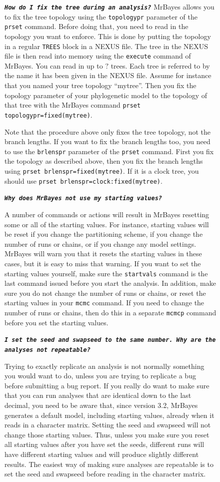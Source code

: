 \documentclass[12pt]{book}
\newcommand{\ttt}[1]{\texttt{#1}}
\newcommand{\tb}[1]{\ttt{\textbf{#1}}}
\begin{document}
\begin{figure}[h]
\tb{\it{How do I fix the tree during an analysis?}}
MrBayes allows you to fix the tree topology using the \ttt{topologypr} parameter of the \ttt{prset}
command. Before doing that, you need to read in the topology you want to enforce. This is done by
putting the topology in a regular \ttt{TREES} block in a NEXUS file. The tree in the NEXUS file is
then read into memory using the \ttt{execute} command of MrBayes. You can read in up to $?$ trees.
Each tree is referred to by the name it has been given in the NEXUS file. Assume for instance that
you named your tree topology ``mytree''. Then you fix the topology parameter of your phylogenetic
model to the topology of that tree with the MrBayes command \ttt{prset topologypr=fixed(mytree)}.

Note that the procedure above only fixes the tree topology, not the branch lengths. If you want to
fix the branch lengths too, you need to use the \ttt{brlenspr} parameter of the \ttt{prset}
command. First you fix the topology as described above, then you fix the branch lengths using
\ttt{prset brlenspr=fixed(mytree)}. If it is a clock tree, you should use \ttt{prset
brlenspr=clock:fixed(mytree)}.

\tb{\it{Why does MrBayes not use my starting values?}}

A number of commands or actions will result in MrBayes resetting some or all of the starting
values. For instance, starting values will be reset if you change the partitioning scheme, if you
change the number of runs or chains, or if you change any model settings. MrBayes will warn you
that it resets the starting values in these cases, but it is easy to miss that warning. If you want
to set the starting values yourself, make sure the \ttt{startvals} command is the last command
issued before you start the analysis. In addition, make sure you do not change the number of runs
or chains, or reset the starting values in your \ttt{mcmc} command. If you need to change the
number of runs or chains, then do this in a separate \ttt{mcmcp} command before you set the
starting values.

\tb{\it{I set the seed and swapseed to the same number. Why are the analyses not repeatable?}}

Trying to exactly replicate an analysis is not normally something you would want to do, unless you
are trying to replicate a bug before submitting a bug report. If you really do want to make sure
that you can run analyses that are identical down to the last decimal, you need to be aware that,
since version 3.2, MrBayes generates a default model, including starting values, already when it
reads in a character matrix. Setting the seed and swapseed will not change those starting values.
Thus, unless you make sure you reset all starting values after you have set the seeds, different
runs will have different starting values and will produce slightly different results. The easiest
way of making sure analyses are repeatable is to set the seed and swapseed before reading in the
character matrix.


\end{figure}
\end{document}
